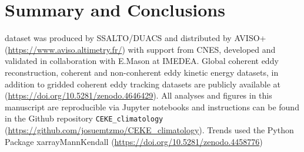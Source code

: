 \documentclass[draft,linenumbers]{agujournal2019}
\begin{document}
	\section{Summary and Conclusions}	
	\label{sec:Conclusions}
	
	\acknowledgments
	\citet{Chelton_mesoscale_2013} dataset was produced by SSALTO/DUACS and distributed by AVISO+ (\url{https://www.aviso.altimetry.fr/}) with support from CNES, developed and validated in collaboration with E.Mason at IMEDEA.
	Global coherent eddy reconstruction, coherent and non-conherent eddy kinetic energy datasets, in addition to gridded coherent eddy tracking datasets are publicly available at (\url{https://doi.org/10.5281/zenodo.4646429}). 
	All analyses and figures in this manuscript are reproducible via Jupyter notebooks and instructions can be found in the Github repository \texttt{CEKE\_climatology} (\url{https://github.com/josuemtzmo/CEKE_climatology}). Trends used the Python Package xarrayMannKendall (\url{https://doi.org/10.5281/zenodo.4458776})
	
	
	
\end{document}
